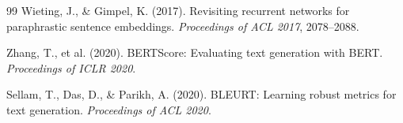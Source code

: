 \documentclass[12pt, a4paper]{article}
\theoremstyle{plain}
\theoremstyle{definition}
\theoremstyle{remark}
\begin{document}
\begin{thebibliography}{99}
Wieting, J., \& Gimpel, K. (2017).
\newblock Revisiting recurrent networks for paraphrastic sentence embeddings.
\newblock \emph{Proceedings of ACL 2017}, 2078--2088.


Zhang, T., et al. (2020).
\newblock BERTScore: Evaluating text generation with BERT.
\newblock \emph{Proceedings of ICLR 2020}.

Sellam, T., Das, D., \& Parikh, A. (2020).
\newblock BLEURT: Learning robust metrics for text generation.
\newblock \emph{Proceedings of ACL 2020}.

\end{thebibliography}
\end{document}

